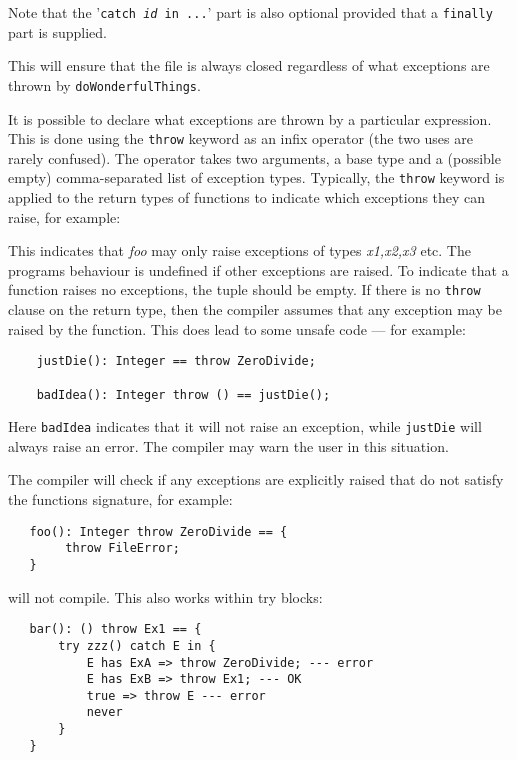 Note that the '{\tt catch {\em id} in ...}' part is also optional
provided that a {\tt finally} part is supplied.

This will ensure that the file is always closed regardless of what
exceptions are thrown by {\tt doWonderfulThings}.


It is possible to declare what exceptions are thrown by a particular
expression.  This is done using the {\tt throw} keyword as an
infix operator (the two uses are rarely confused).  The operator takes
two arguments, a base type and a (possible empty) comma-separated list
of exception types.  Typically, the {\tt throw} keyword is applied to the
return types of functions to indicate which exceptions they can raise,
for example:


This indicates that {\em foo} may only raise exceptions of types {\em x1,x2,x3}
etc.  The programs behaviour is undefined if other exceptions are
raised.  To indicate that a function raises no exceptions, the tuple
should be empty.  If there is no {\tt throw} clause on the return type,
then the compiler assumes that any exception may be raised by the
function.  This does lead to some unsafe code --- for example:

\begin{small}
\begin{verbatim}
    justDie(): Integer == throw ZeroDivide;

    badIdea(): Integer throw () == justDie();
\end{verbatim}
\end{small}

Here {\tt badIdea} indicates that it will not raise an exception,
while {\tt justDie} will always raise an error.  The compiler may
warn the user in this situation.

The compiler will check if any exceptions are explicitly
raised that do not satisfy the functions signature, for example:
\begin{small}
\begin{verbatim}
   foo(): Integer throw ZeroDivide == {
        throw FileError;
   }
\end{verbatim}
\end{small}
will not compile.  This also works within try blocks:
\begin{small}
\begin{verbatim}
   bar(): () throw Ex1 == {
       try zzz() catch E in {
           E has ExA => throw ZeroDivide; --- error
           E has ExB => throw Ex1; --- OK
           true => throw E --- error
           never
       }
   }
\end{verbatim}
\end{small}

